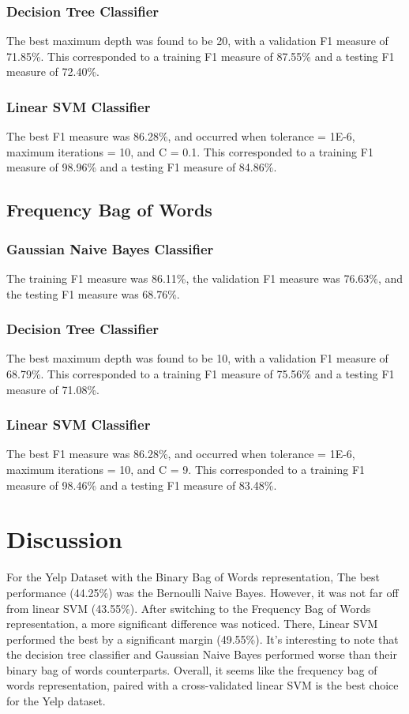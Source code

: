\documentclass[11pt]{article}
\begin{document}
\subsubsection{Decision Tree Classifier}
The best maximum depth was found to be 20, with a validation F1 measure of 71.85\%. This corresponded to a training F1 measure of 87.55\% and a testing F1 measure of 72.40\%.

\subsubsection{Linear SVM Classifier}
The best F1 measure was 86.28\%, and occurred when tolerance = 1E-6, maximum iterations = 10, and C = 0.1. This corresponded to a training F1 measure of 98.96\% and a testing F1 measure of 84.86\%.

\subsection{Frequency Bag of Words}
\subsubsection{Gaussian Naive Bayes Classifier}
The training F1 measure was 86.11\%, the validation F1 measure was 76.63\%, and the testing F1 measure was 68.76\%. 

\subsubsection{Decision Tree Classifier}
The best maximum depth was found to be 10, with a validation F1 measure of 68.79\%. This corresponded to a training F1 measure of 75.56\% and a testing F1 measure of 71.08\%.

\subsubsection{Linear SVM Classifier}
The best F1 measure was 86.28\%, and occurred when tolerance = 1E-6, maximum iterations = 10, and C = 9. This corresponded to a training F1 measure of 98.46\% and a testing F1 measure of 83.48\%.

\section{Discussion}
For the Yelp Dataset with the Binary Bag of Words representation, The best performance (44.25\%) was the Bernoulli Naive Bayes. However, it was not far off from linear SVM (43.55\%). After switching to the Frequency Bag of Words representation, a more significant difference was noticed. There, Linear SVM performed the best by a significant margin (49.55\%). It's interesting to note that the decision tree classifier and Gaussian Naive Bayes performed worse than their binary bag of words counterparts. Overall, it seems like the frequency bag of words representation, paired with a cross-validated linear SVM is the best choice for the Yelp dataset.\\
\end{document}
